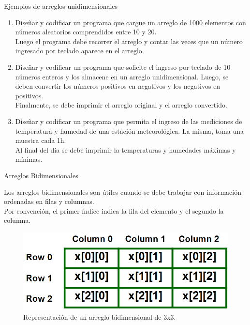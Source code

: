 \documentclass[xcolor=pdftex,table,11pt]{beamer}
\begin{document}
\begin{frame}{Ejemplos de arreglos unidimensionales}
 \begin{enumerate}
   
        \item Diseñar y codificar un programa que cargue un arreglo de 1000 elementos con números aleatorios comprendidos entre 10 y 20.\\
   Luego el programa debe recorrer el arreglo y contar las veces que un número ingresado por teclado aparece en el arreglo.
\href{https://github.com/danis963/informaticaI_IUA/blob/main/c/src/8-0-arrays.c}{}


     \item Diseñar y codificar un programa que solicite el ingreso por teclado de 10 números enteros y los almacene en un arreglo unidimensional. Luego, se deben convertir los números positivos en negativos y los negativos en positivos.\\
Finalmente, se debe imprimir el arreglo original y el arreglo convertido.
\href{https://github.com/danis963/informaticaI_IUA/blob/main/c/src/8-1arrays.c}{}

        \item Diseñar y codificar un programa que permita el ingreso de las mediciones de temperatura y humedad de una estación meteorológica. La misma, toma una muestra cada 1h. \\
        Al final del día se debe imprimir la temperaturas y humedades máximas y mínimas.
\href{https://github.com/danis963/informaticaI_IUA/blob/main/c/src/8-2arrays.c}{}

   \end{enumerate}
\end{frame}



\begin{frame}{Arreglos Bidimensionales}
\begin{block}{}
Los arreglos bidimensionales son útiles cuando se debe trabajar con información ordenadas en filas y columnas.\\
Por convención, el primer índice indica la fila del elemento y el segundo la columna.
\end{block}

\begin{figure}
 \centering
\includegraphics[scale=0.5]{../img/exported/matrix.png}
\caption{Representación de un arreglo bidimensional de 3x3.}
\end{figure}

\end{frame}
\end{document}
